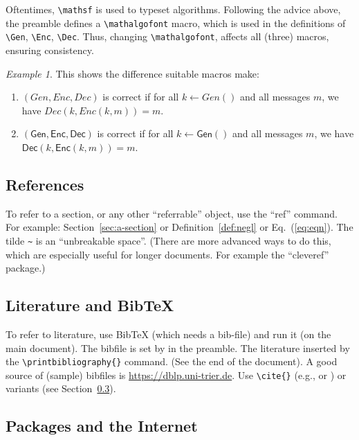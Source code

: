 \documentclass[11pt]{scrartcl}
\theoremstyle{plain} %
\theoremstyle{definition} %
\theoremstyle{remark} %
\newtheorem{example}[theorem]{Example}
\newcommand{\mathalgofont}[1]{\mathsf{#1}} %
\newcommand{\Gen}{\mathalgofont{Gen}}
\newcommand{\Enc}{\mathalgofont{Enc}}
\newcommand{\Dec}{\mathalgofont{Dec}}
\begin{document}
Oftentimes, \verb|\mathsf| is used to typeset algorithms.
Following the advice above, the preamble defines a \verb|\mathalgofont| macro,
which is used in the definitions of \verb|\Gen|, \verb|\Enc|, \verb|\Dec|.
Thus, changing \verb|\mathalgofont|, affects all (three) macros,
ensuring consistency.

\begin{example}
  This shows the difference suitable macros make:
  \begin{enumerate}
    \item $(Gen, Enc, Dec)$ is correct if for all $k \gets Gen()$
    and all messages $m$, we have $Dec(k, Enc(k, m)) = m$.
    \item $(\Gen, \Enc, \Dec)$ is correct if for all $k \gets \Gen()$
    and all messages $m$, we have $\Dec(k, \Enc(k, m)) = m$.
  \end{enumerate}
\end{example}




\subsection{References}
\label{sec:references}

To refer to a section, or any other ``referrable'' object, use the ``ref'' command.
For example: Section~\ref{sec:a-section} or Definition~\ref{def:negl} or Eq.~(\ref{eq:eqn}).
The tilde \verb|~| is an ``unbreakable space''.
(There are more advanced ways to do this, which are especially useful for longer documents.
For example the ``cleveref'' package.)


\subsection{Literature and BibTeX}
\label{subsec:literature}

To refer to literature, use BibTeX (which needs a bib-file) and run it (on the main document).
The bibfile is set by \verb|| in the preamble.
The literature inserted by the \verb|\printbibliography{}| command. (See the end of the document).
A good source of (sample) bibfiles is \url{https://dblp.uni-trier.de}.
Use \verb|\cite{}| (e.g., \cite{DH76} or \cite{RSA78}) or variants (see Section~\ref{subsec:packages}).


\subsection{Packages and the Internet}
\label{subsec:packages}
\end{document}
